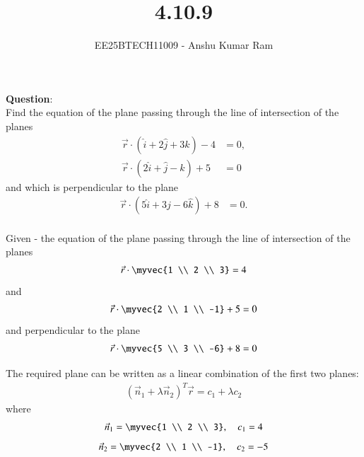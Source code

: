 \documentclass[journal]{IEEEtran}
\begin{document}

\vspace{3cm}

\title{4.10.9}
\author{EE25BTECH11009 - Anshu Kumar Ram }
\maketitle
{\let\newpage\relax\maketitle}

\renewcommand{\thefigure}{\theenumi}
\renewcommand{\thetable}{\theenumi}
\setlength{\intextsep}{10pt} %


\renewcommand{\thetable}{\theenumi}
\textbf{Question}:\\
Find the equation of the plane passing through the line of intersection of the planes 
\begin{align}
\vec{r} \cdot (\hat{i} + 2\hat{j} + 3\hat{k}) - 4 &= 0, \\
\vec{r} \cdot (2\hat{i} + \hat{j} - \hat{k}) + 5 &= 0
\end{align}
and which is perpendicular to the plane 
\begin{align}
\vec{r} \cdot (5\hat{i} + 3\hat{j} - 6\hat{k}) + 8 &= 0.
\end{align}
\solution \\
Given -
the equation of the plane passing through the line of intersection of the planes
\begin{align}
\vec{r}\cdot \myvec{1 \\ 2 \\ 3} = 4 
\end{align}
and 
\begin{align}
\vec{r}\cdot \myvec{2 \\ 1 \\ -1} + 5 = 0
\end{align}
and perpendicular to the plane
\begin{align}
\vec{r}\cdot \myvec{5 \\ 3 \\ -6} + 8 = 0
\end{align}



The required plane can be written as a linear combination of the first two planes:
\begin{align}
(\vec{n}_1 + \lambda \vec{n}_2)^T\vec{r} = c_1 + \lambda c_2
\end{align}
where
\begin{align}
\vec{n}_1 = \myvec{1 \\ 2 \\ 3}, \quad c_1 = 4
\end{align}
\begin{align}
\vec{n}_2 = \myvec{2 \\ 1 \\ -1}, \quad c_2 = -5
\end{align}
\end{document}
